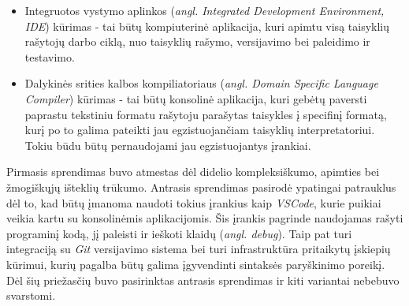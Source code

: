 \begin{activities}
{        \begin{itemize}
            \item Integruotos vystymo aplinkos (\textit{angl. Integrated Development Environment, IDE}) kūrimas - tai būtų kompiuterinė aplikacija, kuri apimtu visą taisyklių rašytojų darbo ciklą, nuo taisyklių rašymo, versijavimo bei paleidimo ir testavimo.
            \item Dalykinės srities kalbos kompiliatoriaus (\textit{angl. Domain Specific Language Compiler}) kūrimas - tai būtų konsolinė aplikacija, kuri gebėtų paversti paprastu tekstiniu formatu rašytoju parašytas taisykles į specifinį formatą, kurį po to galima pateikti jau egzistuojančiam taisyklių interpretatoriui. Tokiu būdu būtų pernaudojami jau egzistuojantys įrankiai.
        \end{itemize}

        Pirmasis sprendimas buvo atmestas dėl didelio kompleksiškumo, apimties bei žmogiškųjų išteklių trūkumo. Antrasis sprendimas pasirodė ypatingai patrauklus dėl to, kad būtų įmanoma naudoti tokius įrankius kaip \textit{VSCode}, kurie puikiai veikia kartu su konsolinėmis aplikacijomis. Šis įrankis pagrinde naudojamas rašyti programinį kodą, jį paleisti ir ieškoti klaidų (\textit{angl. debug}). Taip pat turi integraciją su \textit{Git} versijavimo sistema bei turi infrastruktūra pritaikytų įskiepių kūrimui, kurių pagalba būtų galima įgyvendinti sintaksės paryškinimo poreikį. Dėl šių priežasčių buvo pasirinktas antrasis sprendimas ir kiti variantai nebebuvo svarstomi.
    }
     \row

\end{activities}
